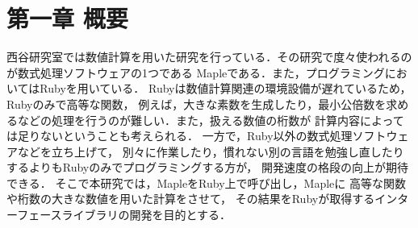 \section{第一章 概要}
西谷研究室では数値計算を用いた研究を行っている．その研究で度々使われるのが数式処理ソフトウェアの1つである
Mapleである．また，プログラミングにおいてはRubyを用いている．
Rubyは数値計算関連の環境設備が遅れているため，Rubyのみで高等な関数，
例えば，大きな素数を生成したり，最小公倍数を求めるなどの処理を行うのが難しい．また，扱える数値の桁数が
計算内容によっては足りないということも考えられる．
一方で，Ruby以外の数式処理ソフトウェアなどを立ち上げて，
別々に作業したり，慣れない別の言語を勉強し直したりするよりもRubyのみでプログラミングする方が，
開発速度の格段の向上が期待できる．
そこで本研究では，MapleをRuby上で呼び出し，Mapleに
高等な関数や桁数の大きな数値を用いた計算をさせて，
その結果をRubyが取得するインターフェースライブラリの開発を目的とする．


